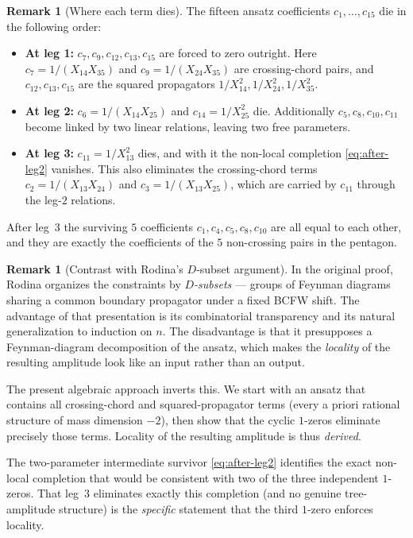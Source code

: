 \documentclass[11pt]{article}
\theoremstyle{plain}
\theoremstyle{definition}
\newtheorem{remark}[theorem]{Remark}
\begin{document}
\begin{remark}[Where each term dies]
The fifteen ansatz coefficients $c_1,\ldots,c_{15}$ die in the following order:
\begin{itemize}[nosep,topsep=2pt]
 \item \textbf{At leg 1:} $c_7, c_9, c_{12}, c_{13}, c_{15}$ are forced to zero outright.
       Here $c_7 = 1/(X_{14}X_{35})$ and $c_9 = 1/(X_{24}X_{35})$ are crossing-chord
       pairs, and $c_{12}, c_{13}, c_{15}$ are the squared propagators
       $1/X_{14}^2, 1/X_{24}^2, 1/X_{35}^2$.
 \item \textbf{At leg 2:} $c_6 = 1/(X_{14}X_{25})$ and $c_{14} = 1/X_{25}^2$ die.
       Additionally $c_5, c_8, c_{10}, c_{11}$ become linked by two linear
       relations, leaving two free parameters.
 \item \textbf{At leg 3:} $c_{11} = 1/X_{13}^2$ dies, and with it the non-local
       completion \eqref{eq:after-leg2} vanishes. This also eliminates the
       crossing-chord terms $c_2 = 1/(X_{13}X_{24})$ and $c_3 = 1/(X_{13}X_{25})$,
       which are carried by $c_{11}$ through the leg-$2$ relations.
\end{itemize}
After leg~$3$ the surviving $5$ coefficients $c_1, c_4, c_5, c_8, c_{10}$ are all
equal to each other, and they are exactly the coefficients of the $5$ non-crossing
pairs in the pentagon.
\end{remark}

\begin{remark}[Contrast with Rodina's $D$-subset argument]
In the original proof, Rodina organizes the constraints by \emph{$D$-subsets} ---
groups of Feynman diagrams sharing a common boundary propagator under a fixed BCFW
shift. The advantage of that presentation is its combinatorial transparency and
its natural generalization to induction on $n$. The disadvantage is that it
presupposes a Feynman-diagram decomposition of the ansatz, which makes the
\emph{locality} of the resulting amplitude look like an input rather than an output.

The present algebraic approach inverts this. We start with an ansatz that contains
all crossing-chord and squared-propagator terms (every a priori rational structure
of mass dimension $-2$), then show that the cyclic $1$-zeros eliminate precisely
those terms. Locality of the resulting amplitude is thus \emph{derived}.

The two-parameter intermediate survivor \eqref{eq:after-leg2} identifies the exact
non-local completion that would be consistent with two of the three independent
$1$-zeros. That leg~$3$ eliminates exactly this completion (and no genuine
tree-amplitude structure) is the \emph{specific} statement that the third $1$-zero
enforces locality.
\end{remark}
\end{document}
